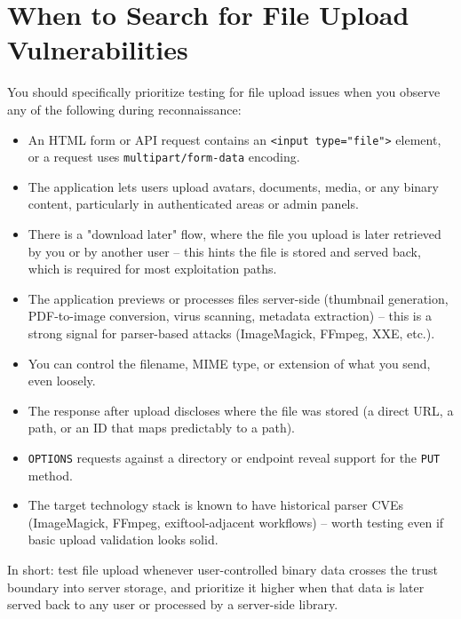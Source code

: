 \documentclass[11pt]{article}
\begin{document}
\section{When to Search for File Upload Vulnerabilities}

You should specifically prioritize testing for file upload issues when you observe any of the following during reconnaissance:

\begin{itemize}[leftmargin=1.4em]
    \item An HTML form or API request contains an \texttt{<input type="file">} element, or a request uses \texttt{multipart/form-data} encoding.
    \item The application lets users upload avatars, documents, media, or any binary content, particularly in authenticated areas or admin panels.
    \item There is a "download later" flow, where the file you upload is later retrieved by you or by another user -- this hints the file is stored and served back, which is required for most exploitation paths.
    \item The application previews or processes files server-side (thumbnail generation, PDF-to-image conversion, virus scanning, metadata extraction) -- this is a strong signal for parser-based attacks (ImageMagick, FFmpeg, XXE, etc.).
    \item You can control the filename, MIME type, or extension of what you send, even loosely.
    \item The response after upload discloses where the file was stored (a direct URL, a path, or an ID that maps predictably to a path).
    \item \texttt{OPTIONS} requests against a directory or endpoint reveal support for the \texttt{PUT} method.
    \item The target technology stack is known to have historical parser CVEs (ImageMagick, FFmpeg, exiftool-adjacent workflows) -- worth testing even if basic upload validation looks solid.
\end{itemize}

In short: test file upload whenever user-controlled binary data crosses the trust boundary into server storage, and prioritize it higher when that data is later served back to any user or processed by a server-side library.

\end{document}
